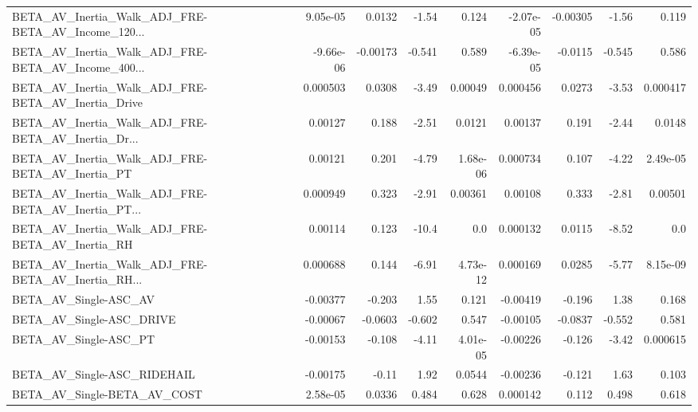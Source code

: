 \begin{tabular}{lrrrrrrrr}
BETA\_AV\_Inertia\_Walk\_ADJ\_FRE-BETA\_AV\_Income\_120... &    9.05e-05 &       0.0132 &    -1.54 &    0.124 &  -2.07e-05 &    -0.00305 &        -1.56 &         0.119 \\
BETA\_AV\_Inertia\_Walk\_ADJ\_FRE-BETA\_AV\_Income\_400... &   -9.66e-06 &     -0.00173 &   -0.541 &    0.589 &  -6.39e-05 &     -0.0115 &       -0.545 &         0.586 \\
BETA\_AV\_Inertia\_Walk\_ADJ\_FRE-BETA\_AV\_Inertia\_Drive &    0.000503 &       0.0308 &    -3.49 &  0.00049 &   0.000456 &      0.0273 &        -3.53 &      0.000417 \\
BETA\_AV\_Inertia\_Walk\_ADJ\_FRE-BETA\_AV\_Inertia\_Dr... &     0.00127 &        0.188 &    -2.51 &   0.0121 &    0.00137 &       0.191 &        -2.44 &        0.0148 \\
BETA\_AV\_Inertia\_Walk\_ADJ\_FRE-BETA\_AV\_Inertia\_PT    &     0.00121 &        0.201 &    -4.79 & 1.68e-06 &   0.000734 &       0.107 &        -4.22 &      2.49e-05 \\
BETA\_AV\_Inertia\_Walk\_ADJ\_FRE-BETA\_AV\_Inertia\_PT... &    0.000949 &        0.323 &    -2.91 &  0.00361 &    0.00108 &       0.333 &        -2.81 &       0.00501 \\
BETA\_AV\_Inertia\_Walk\_ADJ\_FRE-BETA\_AV\_Inertia\_RH    &     0.00114 &        0.123 &    -10.4 &      0.0 &   0.000132 &      0.0115 &        -8.52 &           0.0 \\
BETA\_AV\_Inertia\_Walk\_ADJ\_FRE-BETA\_AV\_Inertia\_RH... &    0.000688 &        0.144 &    -6.91 & 4.73e-12 &   0.000169 &      0.0285 &        -5.77 &      8.15e-09 \\
BETA\_AV\_Single-ASC\_AV                              &    -0.00377 &       -0.203 &     1.55 &    0.121 &   -0.00419 &      -0.196 &         1.38 &         0.168 \\
BETA\_AV\_Single-ASC\_DRIVE                           &    -0.00067 &      -0.0603 &   -0.602 &    0.547 &   -0.00105 &     -0.0837 &       -0.552 &         0.581 \\
BETA\_AV\_Single-ASC\_PT                              &    -0.00153 &       -0.108 &    -4.11 & 4.01e-05 &   -0.00226 &      -0.126 &        -3.42 &      0.000615 \\
BETA\_AV\_Single-ASC\_RIDEHAIL                        &    -0.00175 &        -0.11 &     1.92 &   0.0544 &   -0.00236 &      -0.121 &         1.63 &         0.103 \\
BETA\_AV\_Single-BETA\_AV\_COST                        &    2.58e-05 &       0.0336 &    0.484 &    0.628 &   0.000142 &       0.112 &        0.498 &         0.618 \\

\end{tabular}
